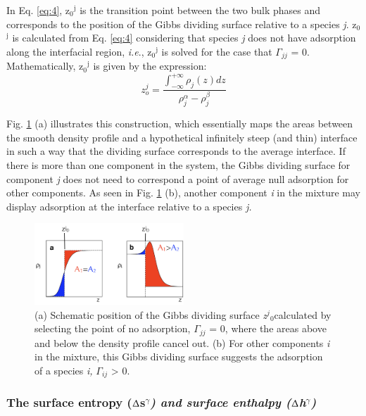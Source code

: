 \documentclass[9pt,bestpractices]{livecoms}
\begin{document}
In Eq. \ref{eq:4}, z$_{0}$$^{\mathrm{j}}$ is the transition point between the two bulk
phases and corresponds to the position of the Gibbs dividing surface relative
to a species \textit{j}. z$_{0}$$^{\mathrm{j}}$ is calculated from Eq. \ref{eq:4}
considering that species \textit{j} does not have adsorption along the
interfacial region, \textit{i.e}., z$_{0}$$^{\mathrm{j}}$ is solved for the
case that ${\Gamma}$$_{jj}$ = 0. Mathematically, z$_{0}$$^{\mathrm{j}}$ is
given by the expression:
\begin{equation}
z_{o}^{j}=\frac{\int_{-\infty}^{+\infty}\rho_{j}\left(z\right)dz}{\rho_{j}^{\alpha}-\rho_{j}^{\beta}}
\end{equation}

Fig. \ref{fig:4} (a) illustrates this construction, which essentially maps the areas
between the smooth density profile and a hypothetical infinitely steep (and
thin) interface in such a way that the dividing surface corresponds to the
average interface. If there is more than one component in the system, the
Gibbs dividing surface for component \textit{j} does not need to correspond
a point of average null adsorption for other components. As seen in Fig. \ref{fig:4} (b),
another component \textit{i} in the mixture may display adsorption at the
interface relative to a species \textit{j.}

\begin{figure}
\includegraphics[width=0.5\textwidth]{gfx/image11.png}
\caption{(a) Schematic position of the Gibbs dividing surface \textit{z}$^{j}$$_{0 }$calculated by selecting the point of no adsorption, ${\Gamma}$$_{jj}$ = 0, where the areas above and below the density profile cancel out. (b) For other components \textit{i}  in the mixture, this Gibbs dividing surface suggests the adsorption of a species \textit{i,} ${\Gamma}$$_{ij}$ {\textgreater} 0.}
\label{fig:4}
\end{figure}

\subsubsection{The surface entropy (${\Updelta}$s$^{{\gamma}}$\textit{) and surface enthalpy (${\Updelta}$h}$^{{\gamma}}$\textit{)}}
\end{document}
